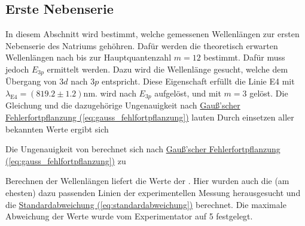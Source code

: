 \subsection*{Erste Nebenserie}
In diesem Abschnitt wird bestimmt, welche gemessenen Wellenlängen zur ersten Nebenserie des Natriums gehöhren. Dafür werden die theoretisch erwarten Wellenlängen nach  bis zur Hauptquantenzahl $m = 12$ bestimmt. 
Dafür muss jedoch $E_{3p}$ ermittelt werden. Dazu wird die Wellenlänge gesucht, welche dem Übergang von $3d$ nach $3p$ entspricht. Diese Eigenschaft erfüllt die Linie E4 mit $\lambda_\text{E4} = (819.2 \pm 1.2) \mathrm{nm}$.  wird nach $E_{3p}$ aufgelöst, und mit $m=3$ gelöst. Die Gleichung und die dazugehörige Ungenauigkeit nach \hyperref[eq:gauss_fehlfortpflanzung]{Gauß'scher Fehlerfortpflanzung (\ref*{eq:gauss_fehlfortpflanzung})} lauten
Durch einsetzen aller bekannten Werte ergibt sich 
 \label{eq:resE3p}

Die Ungenauigkeit von  berechnet sich nach \hyperref[eq:gauss_fehlfortpflanzung]{Gauß'scher Fehlerfortpflanzung (\ref*{eq:gauss_fehlfortpflanzung})}  zu

Berechnen der Wellenlängen liefert die Werte der . Hier wurden auch die (am ehesten) dazu passenden Linien der experimentellen Messung herausgesucht und die \hyperref[eq:standardabweichung]{Standardabweichung (\ref*{eq:standardabweichung})} berechnet. Die maximale Abweichung der Werte wurde vom Experimentator auf 5 festgelegt.

